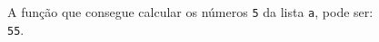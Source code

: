 \documentclass[12pt,varwidth=16cm,border=1pt]{standalone}
\begin{document}
A função que consegue calcular os números \verb+5+ da lista \verb+a+, pode ser: \\ \verb+55+.

\questiomtrue
\end{document}
